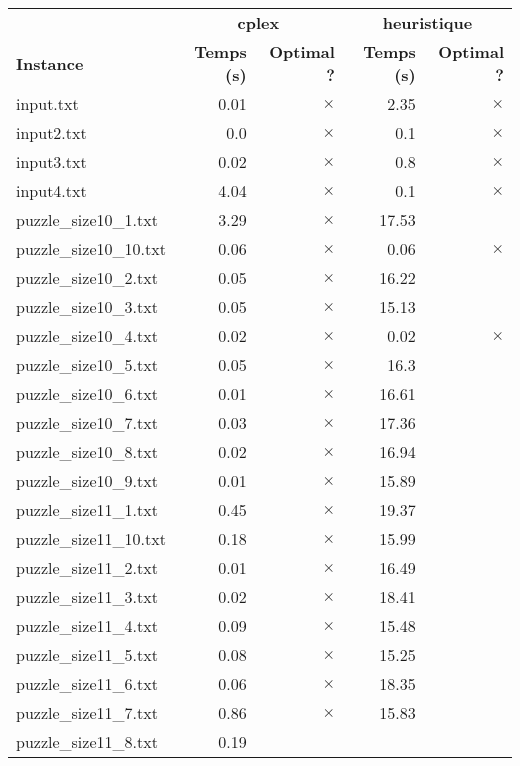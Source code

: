 \documentclass{article}
\begin{document}
\begin{center}
\renewcommand{\arraystretch}{1.4} 
\begin{tabular}{lrrrr}
	\hline
 & \multicolumn{2}{c}{\textbf{cplex}} & \multicolumn{2}{c}{\textbf{heuristique}}\\
\textbf{Instance}  & \textbf{Temps (s)} & \textbf{Optimal ?}  & \textbf{Temps (s)} & \textbf{Optimal ?} \\\hline

input.txt & 0.01 & 
$\times$
 & 2.35 & 
$\times$
\\
input2.txt & 0.0 & 
$\times$
 & 0.1 & 
$\times$
\\
input3.txt & 0.02 & 
$\times$
 & 0.8 & 
$\times$
\\
input4.txt & 4.04 & 
$\times$
 & 0.1 & 
$\times$
\\
puzzle\_size10\_1.txt & 3.29 & 
$\times$
 & 17.53 & 
\\
puzzle\_size10\_10.txt & 0.06 & 
$\times$
 & 0.06 & 
$\times$
\\
puzzle\_size10\_2.txt & 0.05 & 
$\times$
 & 16.22 & 
\\
puzzle\_size10\_3.txt & 0.05 & 
$\times$
 & 15.13 & 
\\
puzzle\_size10\_4.txt & 0.02 & 
$\times$
 & 0.02 & 
$\times$
\\
puzzle\_size10\_5.txt & 0.05 & 
$\times$
 & 16.3 & 
\\
puzzle\_size10\_6.txt & 0.01 & 
$\times$
 & 16.61 & 
\\
puzzle\_size10\_7.txt & 0.03 & 
$\times$
 & 17.36 & 
\\
puzzle\_size10\_8.txt & 0.02 & 
$\times$
 & 16.94 & 
\\
puzzle\_size10\_9.txt & 0.01 & 
$\times$
 & 15.89 & 
\\
puzzle\_size11\_1.txt & 0.45 & 
$\times$
 & 19.37 & 
\\
puzzle\_size11\_10.txt & 0.18 & 
$\times$
 & 15.99 & 
\\
puzzle\_size11\_2.txt & 0.01 & 
$\times$
 & 16.49 & 
\\
puzzle\_size11\_3.txt & 0.02 & 
$\times$
 & 18.41 & 
\\
puzzle\_size11\_4.txt & 0.09 & 
$\times$
 & 15.48 & 
\\
puzzle\_size11\_5.txt & 0.08 & 
$\times$
 & 15.25 & 
\\
puzzle\_size11\_6.txt & 0.06 & 
$\times$
 & 18.35 & 
\\
puzzle\_size11\_7.txt & 0.86 & 
$\times$
 & 15.83 & 
\\
puzzle\_size11\_8.txt & 0.19 & 

\end{tabular}
\end{center}
\end{document}

